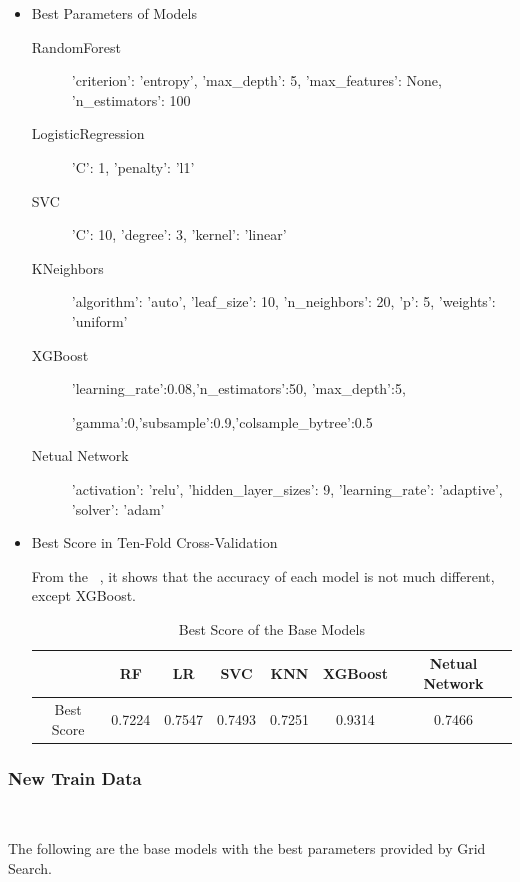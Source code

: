 \begin{itemize}
	\item Best Parameters of Models
	\begin{description}
		\item[RandomForest] 'criterion': 'entropy', 'max_depth': 5, 
		'max_features': None, 'n_estimators': 100
		\item[LogisticRegression] 'C': 1, 'penalty': 'l1'
		\item[SVC] 'C': 10, 'degree': 3, 'kernel': 'linear'
		\item[KNeighbors] 'algorithm': 'auto', 'leaf_size': 10, 
		'n_neighbors': 20, 'p': 5, 'weights': 'uniform'
		\item[XGBoost] 'learning_rate':0.08,'n_estimators':50,
		'max_depth':5,
		
		'gamma':0,'subsample':0.9,'colsample_bytree':0.5
		\item[Netual Network] 'activation': 'relu', 'hidden_layer_sizes': 9, 
		'learning_rate': 'adaptive', 'solver': 'adam'
	\end{description}
	
	\item Best Score in Ten-Fold Cross-Validation
	
	From the  ~,
	it shows that the accuracy of 
	each model is not much different,
	except XGBoost.
	
	\begin{table}[h]  \centering
		\caption{Best Score of the Base Models}
		\label{tbl:best_score_base_models_old}
		\begin{tabular}{ccccccc}
			\toprule
			& RF  & LR & SVC & KNN & XGBoost & Netual Network\\
			\midrule
			Best Score & 0.7224  & 0.7547 & 0.7493 & 0.7251 & 0.9314 & 0.7466\\
			\bottomrule
		\end{tabular}
	\end{table}
\end{itemize}

\subsubsection{New Train Data}
\

The following are the base models 
with the best parameters 
provided by Grid Search.

